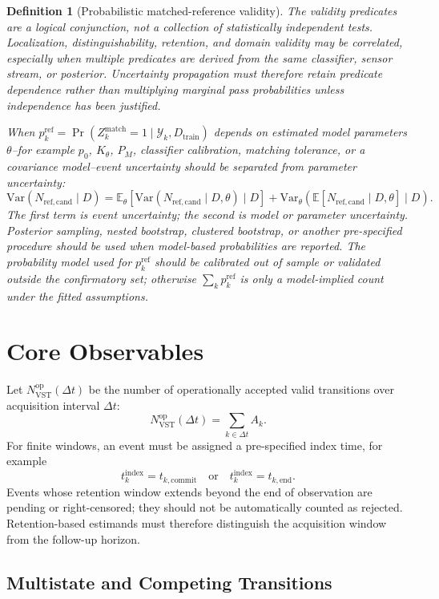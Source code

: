 \documentclass[11pt,a4paper]{article}
\newtheorem{definition}{Definition}
\newcommand{\VST}{\ensuremath{\mathrm{VST}}}
\newcommand{\E}{\mathbb{E}}
\newcommand{\1}{\mathbf{1}}
\begin{document}
\begin{definition}[Probabilistic matched-reference validity]
The validity predicates are a logical conjunction, not a collection of statistically independent tests. Localization, distinguishability, retention, and domain validity may be correlated, especially when multiple predicates are derived from the same classifier, sensor stream, or posterior. Uncertainty propagation must therefore retain predicate dependence rather than multiplying marginal pass probabilities unless independence has been justified.

When $p_k^{\mathrm{ref}}=\Pr(Z^{\mathrm{match}}_k=1\mid\mathcal{Y}_k,D_{\mathrm{train}})$ depends on estimated model parameters $\theta$--for example $p_0$, $K_\theta$, $P_M$, classifier calibration, matching tolerance, or a covariance model--event uncertainty should be separated from parameter uncertainty:
\[
  \mathrm{Var}(N_{\mathrm{ref,cand}}\mid D)
  =
  \E_\theta\!\left[\mathrm{Var}(N_{\mathrm{ref,cand}}\mid D,\theta)\mid D\right]
  +
  \mathrm{Var}_\theta\!\left(\E[N_{\mathrm{ref,cand}}\mid D,\theta]\mid D\right).
\]
The first term is event uncertainty; the second is model or parameter uncertainty. Posterior sampling, nested bootstrap, clustered bootstrap, or another pre-specified procedure should be used when model-based probabilities are reported. The probability model used for $p_k^{\mathrm{ref}}$ should be calibrated out of sample or validated outside the confirmatory set; otherwise $\sum_k p_k^{\mathrm{ref}}$ is only a model-implied count under the fitted assumptions.
\end{definition}

\section{Core Observables}

Let $N_{\VST}^{\mathrm{op}}(\Delta t)$ be the number of operationally accepted valid transitions over acquisition interval $\Delta t$:
\[
  N_{\VST}^{\mathrm{op}}(\Delta t)=\sum_{k\in\Delta t} A_k.
\]
For finite windows, an event must be assigned a pre-specified index time, for example
\[
  t_k^{\mathrm{index}}=t_{k,\mathrm{commit}}
  \quad\mathrm{or}\quad
  t_k^{\mathrm{index}}=t_{k,\mathrm{end}}.
\]
Events whose retention window extends beyond the end of observation are pending or right-censored; they should not be automatically counted as rejected. Retention-based estimands must therefore distinguish the acquisition window from the follow-up horizon.

\subsection{Multistate and Competing Transitions}
\end{document}
